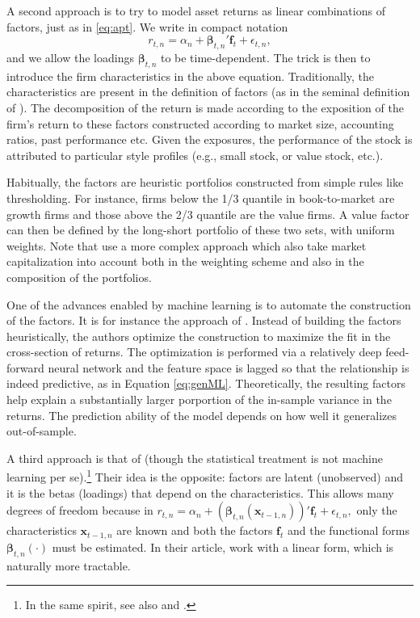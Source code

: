 \documentclass[]{krantz}
\let\rmarkdownfootnote\footnote%
\def\footnote{\protect\rmarkdownfootnote}
\theoremstyle{definition}
\theoremstyle{definition}
\theoremstyle{definition}
\theoremstyle{remark}
\begin{document}
A second approach is to try to model asset returns as linear
combinations of factors, just as in \eqref{eq:apt}. We write in compact
notation
\[r_{t,n}=\alpha_n+\boldsymbol{\beta}_{t,n}'\textbf{f}_t+\epsilon_{t,n},\]
and we allow the loadings \(\boldsymbol{\beta}_{t,n}\) to be
time-dependent. The trick is then to introduce the firm characteristics
in the above equation. Traditionally, the characteristics are present in
the definition of factors (as in the seminal definition of
\citet{fama1993common}). The decomposition of the return is made
according to the exposition of the firm's return to these factors
constructed according to market size, accounting ratios, past
performance etc. Given the exposures, the performance of the stock is
attributed to particular style profiles (e.g., small stock, or value
stock, etc.).

Habitually, the factors are heuristic portfolios constructed from simple
rules like thresholding. For instance, firms below the 1/3 quantile in
book-to-market are growth firms and those above the 2/3 quantile are the
value firms. A value factor can then be defined by the long-short
portfolio of these two sets, with uniform weights. Note that
\citet{fama1993common} use a more complex approach which also take
market capitalization into account both in the weighting scheme and also
in the composition of the portfolios.

One of the advances enabled by machine learning is to automate the
construction of the factors. It is for instance the approach of
\citet{feng2019deep}. Instead of building the factors heuristically, the
authors optimize the construction to maximize the fit in the
cross-section of returns. The optimization is performed via a relatively
deep feed-forward neural network and the feature space is lagged so that
the relationship is indeed predictive, as in Equation \eqref{eq:genML}.
Theoretically, the resulting factors help explain a substantially larger
porportion of the in-sample variance in the returns. The prediction
ability of the model depends on how well it generalizes out-of-sample.

A third approach is that of \citet{kelly2019characteristics} (though the
statistical treatment is not machine learning per se).\footnote{In the
  same spirit, see also \citet{lettau2018estimating} and
  \citet{lettau2018factors}.} Their idea is the opposite: factors are
latent (unobserved) and it is the betas (loadings) that depend on the
characteristics. This allows many degrees of freedom because in
\(r_{t,n}=\alpha_n+(\boldsymbol{\beta}_{t,n}(\textbf{x}_{t-1,n}))'\textbf{f}_t+\epsilon_{t,n},\)
only the characteristics \(\textbf{x}_{t-1,n}\) are known and both the
factors \(\textbf{f}_t\) and the functional forms
\(\boldsymbol{\beta}_{t,n}(\cdot)\) must be estimated. In their article,
\citet{kelly2019characteristics} work with a linear form, which is
naturally more tractable.
\end{document}
